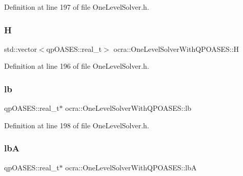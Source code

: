 Definition at line 197 of file One\+Level\+Solver.\+h.

\hypertarget{classocra_1_1OneLevelSolverWithQPOASES_aba3bdf7d777d9e3e8015570652cf396a}{}\label{classocra_1_1OneLevelSolverWithQPOASES_aba3bdf7d777d9e3e8015570652cf396a} 
\subsubsection{\texorpdfstring{H}{H}}
{\footnotesize\ttfamily std\+::vector$<$qp\+O\+A\+S\+E\+S\+::real\+\_\+t$>$ ocra\+::\+One\+Level\+Solver\+With\+Q\+P\+O\+A\+S\+E\+S\+::H\hspace{0.3cm}{\ttfamily [protected]}}



Definition at line 196 of file One\+Level\+Solver.\+h.

\hypertarget{classocra_1_1OneLevelSolverWithQPOASES_a82eaebae8f92464066e9b5348b1737f9}{}\label{classocra_1_1OneLevelSolverWithQPOASES_a82eaebae8f92464066e9b5348b1737f9} 
\subsubsection{\texorpdfstring{lb}{lb}}
{\footnotesize\ttfamily qp\+O\+A\+S\+E\+S\+::real\+\_\+t$\ast$ ocra\+::\+One\+Level\+Solver\+With\+Q\+P\+O\+A\+S\+E\+S\+::lb\hspace{0.3cm}{\ttfamily [protected]}}



Definition at line 198 of file One\+Level\+Solver.\+h.

\hypertarget{classocra_1_1OneLevelSolverWithQPOASES_a268dd33567d130672824404fdf98882a}{}\label{classocra_1_1OneLevelSolverWithQPOASES_a268dd33567d130672824404fdf98882a} 
\subsubsection{\texorpdfstring{lbA}{lbA}}
{\footnotesize\ttfamily qp\+O\+A\+S\+E\+S\+::real\+\_\+t$\ast$ ocra\+::\+One\+Level\+Solver\+With\+Q\+P\+O\+A\+S\+E\+S\+::lbA\hspace{0.3cm}{\ttfamily [protected]}}



